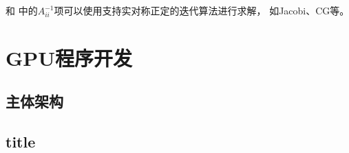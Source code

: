 和
中的$A_{ii}^{-1}$项可以使用支持实对称正定的迭代算法进行求解，
如Jacobi、CG等。


\section{GPU程序开发}

\subsection{主体架构}

\subsection{title}
